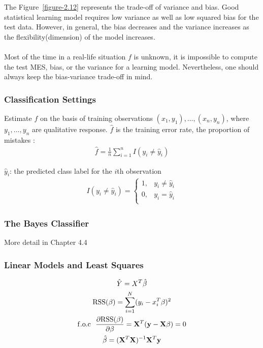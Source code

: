 \documentclass[12pt,a4paper]{article}%
\theoremstyle{definition}
\theoremstyle{plain}
\numberwithin{equation}{section}
\begin{document}
The Figure~\ref{figure-2.12} represents the trade-off of variance and bias. Good statistical learning model requires low variance as well as low squared bias for the test data.
However, in general, the bias decreases and the variance increases as the flexibility(dimension) of the model increases. \\
~\\
Most of the time in a real-life situation $f$ is unknown, it is impossible to compute the test MES, bias, or the variance for a learning model.
Nevertheless, one should always keep the bias-variance trade-off in mind.


\subsubsection{\textbf{Classification Settings}}
Estimate $f$ on the basis of training observations ${(x_{1},y_{1}),\dots,(x_{n},y_{n})}$, where $y_{1},\dots,y_{n}$ are qualitative response.
$\hat{f}$ is the training error rate, the proportion of mistakes :
\begin{gather}
\hat{f} = \frac{1}{n}\sum\limits_{i=1}^{n}I(y_{i}\neq \hat{y}_{i})
\end{gather}

$\hat{y}_{i}$: the predicted class label for the $i$th observation
\begin{gather}
I(y_{i}\neq \hat{y}_{i}) = \left\{
\begin{array}{ll}
1, & y_{i}\neq \hat{y}_{i}\\
0, & y_{i}=\hat{y}_{i}\\
\end{array} \right.
\end{gather}


\subsubsection{\textbf{The Bayes Classifier}}

More detail in Chapter 4.4

\subsubsection{\textbf{Linear Models and Least Squares}}
\begin{gather}
\hat{Y} = X^{T}\hat{\beta} \\
{\rm RSS}(\beta) = \sum\limits_{i=1}^{N} (y_{i}-x_{i}^{T}\beta)^{2} \\
{\rm f.o.c}~~ \frac{\partial {\rm RSS}(\beta)}{\partial \beta} = \mathbf{X}^{T}(\mathbf{y}-\mathbf{X}\beta)=0 \\
\hat{\beta} = (\mathbf{X}^{T}\mathbf{X})^{-1}\mathbf{X}^{T}\mathbf{y}
\end{gather}
\end{document}
